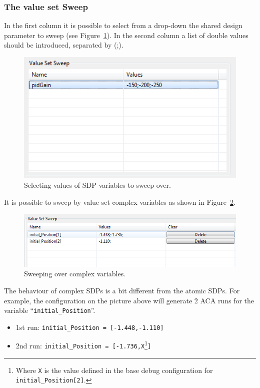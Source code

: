 \documentclass{crescendorepchap}
\begin{document}
\subsubsection{The value set Sweep}

In the first column it is possible to select from a drop-down the shared
design parameter to sweep (see Figure~\ref{fig:ValueSetSweep}). 
In the second column a list of double values
should be introduced, separated by (;).

\begin{figure}[htbp]
\centering
\includegraphics[width=.6\textwidth]{images/ValueSetSweep.PNG}
\caption{Selecting values of SDP variables to sweep over.\label{fig:ValueSetSweep}}
\end{figure}

It is possible to sweep by value set complex variables as shown in Figure~\ref{fig:ValueSetSweepComplex}.

\begin{figure}[htbp]
\centering
\includegraphics[width=.6\textwidth]{images/ValueSetSweepComplex.png}
\caption{Sweeping over complex variables.\label{fig:ValueSetSweepComplex}}
\end{figure}

The behaviour of complex SDPs is a bit different from the atomic SDPs.
For example, the configuration on the picture above will generate 2 ACA
runs for the variable ``\texttt{initial\_Position}''.

\begin{itemize}
\item 1st run: \texttt{initial\_Position = {[}-1.448,-1.110{]}}

\item 2nd run: \texttt{initial\_Position = {[}-1.736,X}\footnote{Where \texttt{X} is the value
defined in the base debug configuration for \texttt{initial\_Position{[}2{]}}.}\texttt{{]}}
\end{itemize}
\end{document}
